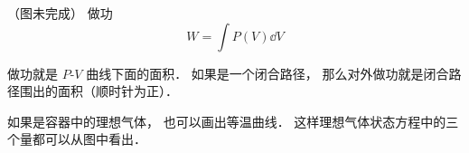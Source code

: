 

（图未完成）
做功
\begin{equation}\label{PVgraf_eq1}
W = \int P(V) \dd{V}
\end{equation}

做功就是 $P$-$V$ 曲线下面的面积． 如果是一个闭合路径， 那么对外做功就是闭合路径围出的面积（顺时针为正）．

如果是容器中的理想气体， 也可以画出等温曲线． 这样理想气体状态方程中的三个量都可以从图中看出．
